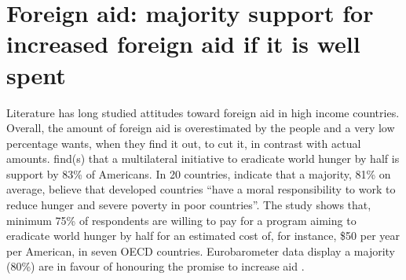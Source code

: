 



\section{Foreign aid: majority support for increased foreign aid if it is well spent}

Literature has long studied attitudes toward foreign aid in high income countries. Overall, the amount of foreign aid is overestimated by the people and a very low percentage wants, when they find it out, to cut it, in contrast with actual amounts. \citet{PIPA2001} find(s) that a multilateral initiative to eradicate world hunger by half is support by 83\% of Americans. In 20 countries, \citet{PIPA2008} indicate that a majority, 81\% on average, believe that developed countries ``have a moral responsibility to work to reduce hunger and severe poverty in poor countries''. The study shows that, minimum 75\% of respondents are willing to pay for a program aiming to eradicate world hunger by half for an estimated cost of, for instance, \$50 per year per American, in seven OECD countries. Eurobarometer data display a majority (80\%) are in favour of honouring the promise to increase aid \citep{cho_ideology_2024}.


